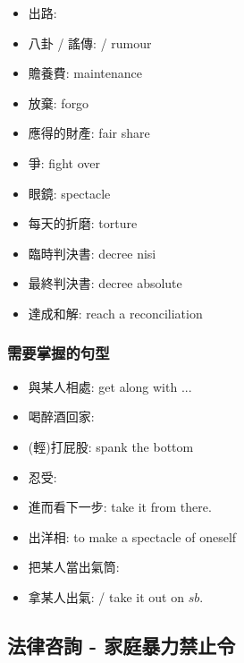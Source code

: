 \begin{multicols}{2}
\begin{itemize}
  \item 出路: 
  \item 八卦 / 謠傳:  / rumour
  \item 贍養費: maintenance
  \item 放棄: forgo
  \item 應得的財產: fair share
  \item 爭: fight over
  \item 眼鏡: spectacle
  \item 每天的折磨:  torture
  \item 臨時判決書: decree nisi
  \item 最終判決書: decree absolute
  \item 達成和解: reach a reconciliation
\end{itemize}
\end{multicols}

\subsubsection*{需要掌握的句型}
\begin{multicols}{2}
\begin{itemize}
  \itemsep0em
  \item 與某人相處: get along with ...
  \item 喝醉酒回家: 
  \item (輕)打屁股: spank the bottom
  \item 忍受: 
  \item 進而看下一步: take it from there.
  \item 出洋相: to make a spectacle of oneself
  \item 把某人當出氣筒: 
  \item 拿某人出氣:  / take it out on $sb.$
\end{itemize}
\end{multicols}

\subsection{法律咨詢 - 家庭暴力禁止令}

